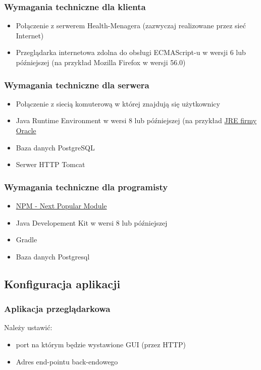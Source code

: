 \documentclass[polish,12pt]{aghthesis}
\begin{document}
\subsubsection{Wymagania techniczne dla klienta}
\begin{itemize}
  \item  Połączenie z serwerem Health-Menagera (zazwyczaj realizowane przez sieć Internet)
  \item Przeglądarka internetowa zdolna do obsługi ECMAScript-u w wersji 6 lub późniejszej (na przykład Mozilla Firefox w wersji 56.0)
\end{itemize}

\subsubsection{Wymagania techniczne dla serwera}
\begin{itemize}
    \item Połączenie z siecią komuterową w której znajdują się użytkownicy
    \item Java Runtime Environment w wersi 8 lub późniejszej (na przykład \href{https://www.java.com/pl/download/manual.jsp}{JRE firmy Oracle}
    \item Baza danych PostgreSQL
    \item Serwer HTTP Tomcat
\end{itemize}

\subsubsection{Wymagania techniczne dla programisty}
\begin{itemize}
    \item \href{https://www.npmjs.com/}{NPM - Next Popular Module}
    \item Java Developement Kit w wersi 8 lub późniejszej
    \item Gradle
    \item Baza danych Postgresql
\end{itemize}


\subsection{Konfiguracja aplikacji}
\subsubsection{Aplikacja przeglądarkowa}{Należy ustawić:
\begin{itemize}
    \item port na którym będzie wystawione GUI (przez HTTP)
    \item Adres end-pointu back-endowego
\end{itemize}}
\end{document}
